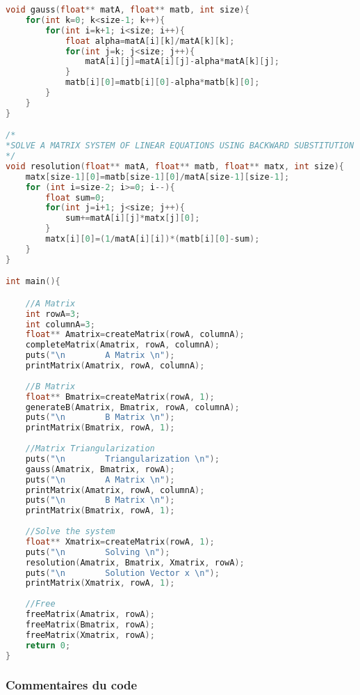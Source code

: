 \documentclass{report}
\begin{document}
\begin{lstlisting}[language=C,inputencoding=utf8]
void gauss(float** matA, float** matb, int size){
	for(int k=0; k<size-1; k++){
		for(int i=k+1; i<size; i++){
			float alpha=matA[i][k]/matA[k][k];
			for(int j=k; j<size; j++){
				matA[i][j]=matA[i][j]-alpha*matA[k][j];
			}
			matb[i][0]=matb[i][0]-alpha*matb[k][0];
		}
	}
}

/*
*SOLVE A MATRIX SYSTEM OF LINEAR EQUATIONS USING BACKWARD SUBSTITUTION
*/
void resolution(float** matA, float** matb, float** matx, int size){
	matx[size-1][0]=matb[size-1][0]/matA[size-1][size-1];
	for (int i=size-2; i>=0; i--){
		float sum=0;
		for(int j=i+1; j<size; j++){
			sum+=matA[i][j]*matx[j][0];
		}
		matx[i][0]=(1/matA[i][i])*(matb[i][0]-sum);
	}
}

int main(){

	//A Matrix
	int rowA=3;
	int columnA=3;
	float** Amatrix=createMatrix(rowA, columnA);
	completeMatrix(Amatrix, rowA, columnA);
	puts("\n		A Matrix \n");
	printMatrix(Amatrix, rowA, columnA);
	
	//B Matrix
	float** Bmatrix=createMatrix(rowA, 1);
	generateB(Amatrix, Bmatrix, rowA, columnA);
	puts("\n		B Matrix \n");
	printMatrix(Bmatrix, rowA, 1);
	
	//Matrix Triangularization
	puts("\n		Triangularization \n");
	gauss(Amatrix, Bmatrix, rowA);
	puts("\n		A Matrix \n");
	printMatrix(Amatrix, rowA, columnA);
	puts("\n		B Matrix \n");
	printMatrix(Bmatrix, rowA, 1);
	
	//Solve the system
	float** Xmatrix=createMatrix(rowA, 1);
	puts("\n		Solving \n");
	resolution(Amatrix, Bmatrix, Xmatrix, rowA);
	puts("\n		Solution Vector x \n");
	printMatrix(Xmatrix, rowA, 1);
	
	//Free
	freeMatrix(Amatrix, rowA);
	freeMatrix(Bmatrix, rowA);
	freeMatrix(Xmatrix, rowA);
	return 0;
}
\end{lstlisting}

\subsubsection{Commentaires du code}
\end{document}
